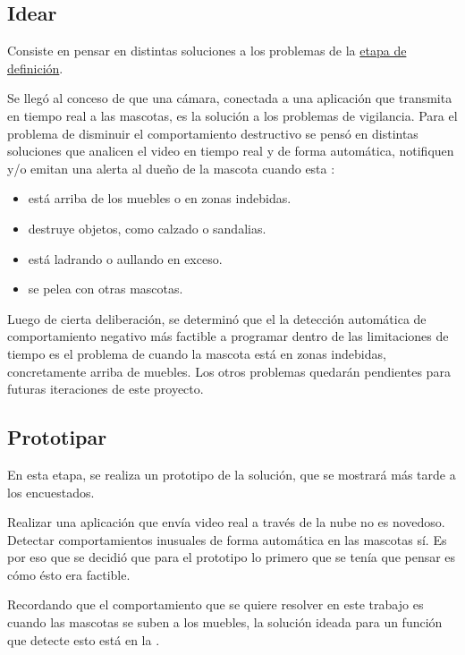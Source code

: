 \documentclass[12pt,a4paper]{proyectoinnovacion}
\begin{document}
\subsection{Idear}
\label{sec:idear}

Consiste en pensar en distintas soluciones a los problemas de la \hyperref[sec:definir]{etapa de definición}.

Se llegó al conceso de que una cámara, conectada a una aplicación que transmita en tiempo real a las mascotas, es la solución a los problemas de vigilancia. Para el problema de disminuir el comportamiento destructivo se pensó en distintas soluciones que analicen el video en tiempo real y de forma automática, notifiquen y/o emitan una alerta al dueño de la mascota cuando esta :

\begin{itemize}
  \item está arriba de los muebles o en zonas indebidas.
  \item destruye objetos, como calzado o sandalias.
  \item está ladrando o aullando en exceso.
  \item se pelea con otras mascotas.
\end{itemize}

Luego de cierta deliberación, se determinó que el la detección automática de  comportamiento negativo más factible a programar dentro de las limitaciones de tiempo es el problema de cuando la mascota está en zonas indebidas, concretamente arriba de muebles. Los otros problemas quedarán pendientes para futuras iteraciones de este proyecto.

\subsection{Prototipar}

En esta etapa, se realiza un prototipo de la solución, que se mostrará más tarde a los encuestados.

Realizar una aplicación que envía video real a través de la nube no es novedoso. Detectar comportamientos inusuales de forma automática en las mascotas sí. Es por eso que se decidió que para el prototipo lo primero que se tenía que pensar es cómo ésto era factible. 

Recordando que el comportamiento que se quiere resolver en este trabajo es cuando las mascotas se suben a los muebles, la solución ideada para un función que detecte esto está en la .
\end{document}
